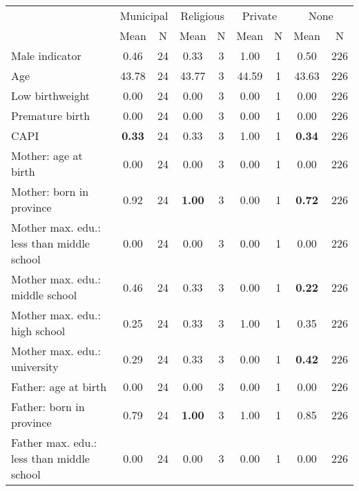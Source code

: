\begin{tabular}{l c c c c c c c c}
\toprule
& \multicolumn{2}{c}{Municipal} & \multicolumn{2}{c}{Religious} & \multicolumn{2}{c}{Private} & \multicolumn{2}{c}{None} \\
& \scriptsize Mean & \scriptsize N & \scriptsize Mean & \scriptsize N & \scriptsize Mean & \scriptsize N & \scriptsize Mean & \scriptsize N \\
\midrule
Male indicator &      0.46 &        24 &      0.33 &         3 &      1.00 &         1 &      0.50 &       226 \\
Age &     43.78 &        24 &     43.77 &         3 &     44.59 &         1 &     43.63 &       226 \\
Low birthweight &      0.00 &        24 &      0.00 &         3 &      0.00 &         1 &      0.00 &       226 \\
Premature birth &      0.00 &        24 &      0.00 &         3 &      0.00 &         1 &      0.00 &       226 \\
CAPI & \textbf{     0.33} &        24 &      0.33 &         3 &      1.00 &         1 & \textbf{     0.34} &       226 \\
Mother: age at birth &      0.00 &        24 &      0.00 &         3 &      0.00 &         1 &      0.00 &       226 \\
Mother: born in province &      0.92 &        24 & \textbf{     1.00} &         3 &      0.00 &         1 & \textbf{     0.72} &       226 \\
Mother max. edu.: less than middle school &      0.00 &        24 &      0.00 &         3 &      0.00 &         1 &      0.00 &       226 \\
Mother max. edu.: middle school &      0.46 &        24 &      0.33 &         3 &      0.00 &         1 & \textbf{     0.22} &       226 \\
Mother max. edu.: high school &      0.25 &        24 &      0.33 &         3 &      1.00 &         1 &      0.35 &       226 \\
Mother max. edu.: university &      0.29 &        24 &      0.33 &         3 &      0.00 &         1 & \textbf{     0.42} &       226 \\
Father: age at birth &      0.00 &        24 &      0.00 &         3 &      0.00 &         1 &      0.00 &       226 \\
Father: born in province &      0.79 &        24 & \textbf{     1.00} &         3 &      1.00 &         1 &      0.85 &       226 \\
Father max. edu.: less than middle school &      0.00 &        24 &      0.00 &         3 &      0.00 &         1 &      0.00 &       226 \\

\end{tabular}

